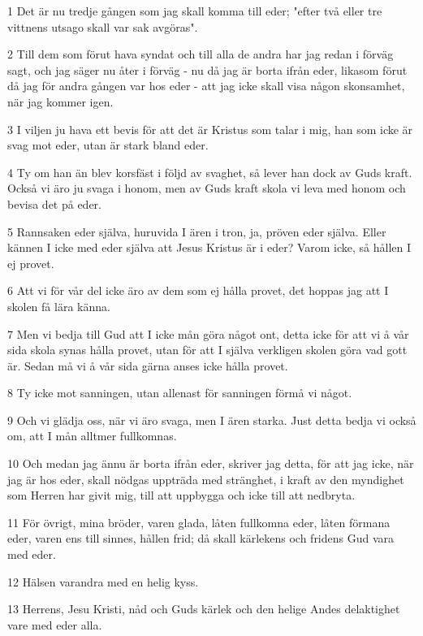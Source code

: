 \par 1 Det är nu tredje gången som jag skall komma till eder; "efter två eller tre vittnens utsago skall var sak avgöras".
\par 2 Till dem som förut hava syndat och till alla de andra har jag redan i förväg sagt, och jag säger nu åter i förväg - nu då jag är borta ifrån eder, likasom förut då jag för andra gången var hos eder - att jag icke skall visa någon skonsamhet, när jag kommer igen.
\par 3 I viljen ju hava ett bevis för att det är Kristus som talar i mig, han som icke är svag mot eder, utan är stark bland eder.
\par 4 Ty om han än blev korsfäst i följd av svaghet, så lever han dock av Guds kraft. Också vi äro ju svaga i honom, men av Guds kraft skola vi leva med honom och bevisa det på eder.
\par 5 Rannsaken eder själva, huruvida I ären i tron, ja, pröven eder själva. Eller kännen I icke med eder själva att Jesus Kristus är i eder? Varom icke, så hållen I ej provet.
\par 6 Att vi för vår del icke äro av dem som ej hålla provet, det hoppas jag att I skolen få lära känna.
\par 7 Men vi bedja till Gud att I icke mån göra något ont, detta icke för att vi å vår sida skola synas hålla provet, utan för att I själva verkligen skolen göra vad gott är. Sedan må vi å vår sida gärna anses icke hålla provet.
\par 8 Ty icke mot sanningen, utan allenast för sanningen förmå vi något.
\par 9 Och vi glädja oss, när vi äro svaga, men I ären starka. Just detta bedja vi också om, att I mån alltmer fullkomnas.
\par 10 Och medan jag ännu är borta ifrån eder, skriver jag detta, för att jag icke, när jag är hos eder, skall nödgas uppträda med stränghet, i kraft av den myndighet som Herren har givit mig, till att uppbygga och icke till att nedbryta.
\par 11 För övrigt, mina bröder, varen glada, låten fullkomna eder, låten förmana eder, varen ens till sinnes, hållen frid; då skall kärlekens och fridens Gud vara med eder.
\par 12 Hälsen varandra med en helig kyss.
\par 13 Herrens, Jesu Kristi, nåd och Guds kärlek och den helige Andes delaktighet vare med eder alla.



